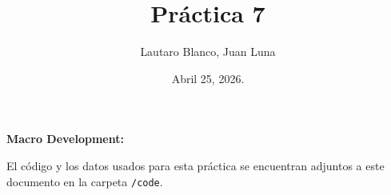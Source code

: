 \documentclass[10pt]{article}
\title{Práctica 7}
\date{Abril 25, 2026.}
\author{Lautaro Blanco, Juan Luna}
\renewcommand{\maketitle}{
	{\centering  
		{\large \textbf{Macro Development: \thetitle}}
		\vspace{4pt}
		
		\theauthor
		
		\vspace{4pt}
		\thedate
		
		\vspace{10pt}}
}
\begin{document}
	\pagestyle{fancy}
	\thispagestyle{empty}
	\maketitle
	
	El código y los datos usados para esta práctica se encuentran adjuntos a este documento en la carpeta \texttt{/code}.
	
	\tableofcontents
	\clearpage
	
	
	
	
\end{document}
